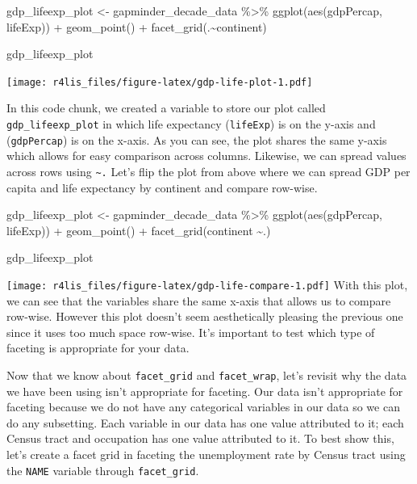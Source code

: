 \documentclass[
  krantz2]{krantz}
\makeatletter
\newenvironment{Shaded}{\begin{snugshade}}{\end{snugshade}}
\newcommand{\FunctionTok}[1]{\textcolor[rgb]{0,0,0}{#1}}
\newcommand{\NormalTok}[1]{#1}
\newcommand{\OtherTok}[1]{\textcolor[rgb]{0.37,0.37,0.37}{#1}}
\newcommand{\SpecialCharTok}[1]{\textcolor[rgb]{0,0,0}{#1}}
\newenvironment{kframe}{%
\medskip{}
\setlength{\fboxsep}{.8em}
 \def\at@end@of@kframe{}%
 \ifinner\ifhmode%
  \def\at@end@of@kframe{\end{minipage}}%
  \begin{minipage}{\columnwidth}%
 \fi\fi%
 \def\FrameCommand##1{\hskip\@totalleftmargin \hskip-\fboxsep
 \colorbox{shadecolor}{##1}\hskip-\fboxsep
     \hskip-\linewidth \hskip-\@totalleftmargin \hskip\columnwidth}%
 \MakeFramed {\advance\hsize-\width
   \@totalleftmargin\z@ \linewidth\hsize
   \@setminipage}}%
 {\par\unskip\endMakeFramed%
 \at@end@of@kframe}
\renewenvironment{Shaded}{\begin{kframe}}{\end{kframe}}
\makeatother
\begin{document}
\begin{Shaded}
\begin{Highlighting}[]
\NormalTok{gdp\_lifeexp\_plot }\OtherTok{\textless{}{-}}\NormalTok{ gapminder\_decade\_data }\SpecialCharTok{\%\textgreater{}\%}
  \FunctionTok{ggplot}\NormalTok{(}\FunctionTok{aes}\NormalTok{(gdpPercap, lifeExp)) }\SpecialCharTok{+}
  \FunctionTok{geom\_point}\NormalTok{() }\SpecialCharTok{+}
  \FunctionTok{facet\_grid}\NormalTok{(.}\SpecialCharTok{\textasciitilde{}}\NormalTok{continent)}

\NormalTok{gdp\_lifeexp\_plot}
\end{Highlighting}
\end{Shaded}

\texttt{[image: r4lis\_files/figure-latex/gdp-life-plot-1.pdf]}

In this code chunk, we created a variable to store our plot called \texttt{gdp\_lifeexp\_plot} in which life expectancy (\texttt{lifeExp}) is on the y-axis and (\texttt{gdpPercap}) is on the x-axis. As you can see, the plot shares the same y-axis which allows for easy comparison across columns. Likewise, we can spread values across rows using \texttt{\textasciitilde{}.} Let's flip the plot from above where we can spread GDP per capita and life expectancy by continent and compare row-wise.

\begin{Shaded}
\begin{Highlighting}[]
\NormalTok{gdp\_lifeexp\_plot }\OtherTok{\textless{}{-}}\NormalTok{ gapminder\_decade\_data }\SpecialCharTok{\%\textgreater{}\%}
  \FunctionTok{ggplot}\NormalTok{(}\FunctionTok{aes}\NormalTok{(gdpPercap, lifeExp)) }\SpecialCharTok{+}
  \FunctionTok{geom\_point}\NormalTok{() }\SpecialCharTok{+}
  \FunctionTok{facet\_grid}\NormalTok{(continent }\SpecialCharTok{\textasciitilde{}}\NormalTok{.)}

\NormalTok{gdp\_lifeexp\_plot}
\end{Highlighting}
\end{Shaded}

\texttt{[image: r4lis\_files/figure-latex/gdp-life-compare-1.pdf]}
With this plot, we can see that the variables share the same x-axis that allows us to compare row-wise. However this plot doesn't seem aesthetically pleasing the previous one since it uses too much space row-wise. It's important to test which type of faceting is appropriate for your data.

Now that we know about \texttt{facet\_grid} and \texttt{facet\_wrap}, let's revisit why the data we have been using isn't appropriate for faceting. Our data isn't appropriate for faceting because we do not have any categorical variables in our data so we can do any subsetting. Each variable in our data has one value attributed to it; each Census tract and occupation has one value attributed to it. To best show this, let's create a facet grid in faceting the unemployment rate by Census tract using the \texttt{NAME} variable through \texttt{facet\_grid}.
\end{document}
